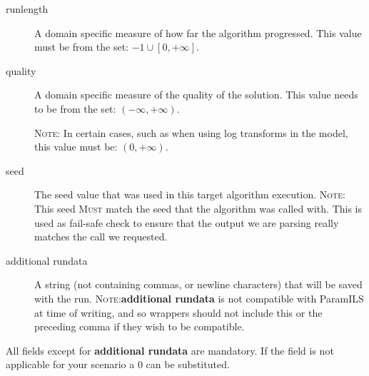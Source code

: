\documentclass[manual.tex]{subfiles}
\begin{document}
\begin{description}
\item [{runlength}] A domain specific measure of how far the algorithm
progressed. This value must be from the set: ${-1} \cup [0,+\infty]$.

\item [{quality}] A domain specific measure of the quality of the solution. This value needs to be 
from the set: $(-\infty, +\infty)$. 

\textsc{Note}: In certain cases, such as when using log transforms in the model, this value must be: $(0, +\infty)$.

\item [{seed}] The seed value that was used in this target algorithm execution.
\textsc{Note:} This seed \textsc{Must} match the seed that the algorithm was
called with. This is used as fail-safe check to ensure that the output
we are parsing really matches the call we requested.
\item[{additional rundata}] A string (not containing commas, or newline characters) that will be saved with the run.
\textsc{Note}:\textbf{additional rundata} is not compatible with ParamILS at time of writing, and so wrappers should not include this or the preceding comma if they wish to be compatible.


\end{description}
All fields except for \textbf{additional rundata} are mandatory. If the field is not applicable for your scenario a 0 can be substituted.
\end{document}

